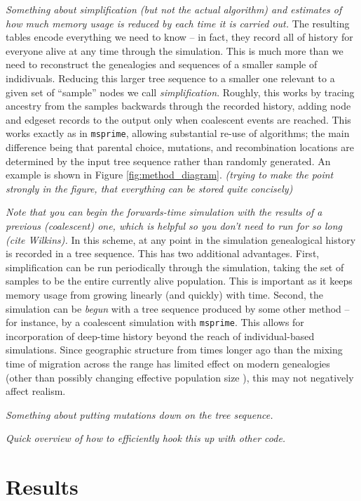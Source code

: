 \documentclass{article}
\newcommand{\msprime}{\texttt{msprime}}
\newcommand{\plr}[1]{{\em \color{blue} #1}}
\begin{document}
\plr{Something about simplification (but not the actual algorithm)
and estimates of how much memory usage is reduced by each time it is carried out.}
The resulting tables encode everything we need to know --
in fact, they record all of history for everyone alive at any time through the simulation.
This is much more than we need to reconstruct the genealogies and sequences
of a smaller sample of indidivuals.
Reducing this larger tree sequence to a smaller one relevant to a given set of ``sample'' nodes
we call \emph{simplification}.
Roughly, this works by tracing ancestry from the samples backwards through the recorded history,
adding node and edgeset records to the output only when coalescent events are reached.
This works exactly as in \msprime, allowing substantial re-use of algorithms;
the main difference being that parental choice, mutations, and recombination locations 
are determined by the input tree sequence
rather than randomly generated.
An example is shown in Figure \ref{fig:method_diagram}.
\plr{(trying to make the point strongly in the figure, that everything can be stored quite concisely)}

\plr{Note that you can begin the forwards-time simulation with the results of a previous (coalescent) one,
which is helpful so you don't need to run for so long (cite Wilkins).}
In this scheme,
at any point in the simulation genealogical history is recorded in a tree sequence.
This has two additional advantages.
First, simplification can be run periodically through the simulation,
taking the set of samples to be the entire currently alive population.
This is important as it keeps memory usage from growing linearly (and quickly) with time.
Second, the simulation can be \emph{begun} with a tree sequence produced by some other method --
for instance, by a coalescent simulation with \msprime.
This allows for incorporation of deep-time history beyond the reach of individual-based simulations.
Since geographic structure from times longer ago than the mixing time of migration across the range
has limited effect on modern genealogies \citep{wilkins_separation}
(other than possibly changing effective population size \citet{durretspatial}),
this may not negatively affect realism.

\plr{Something about putting mutations down on the tree sequence.}

\plr{Quick overview of how to efficiently hook this up with other code.}

\section*{Results}
\end{document}
